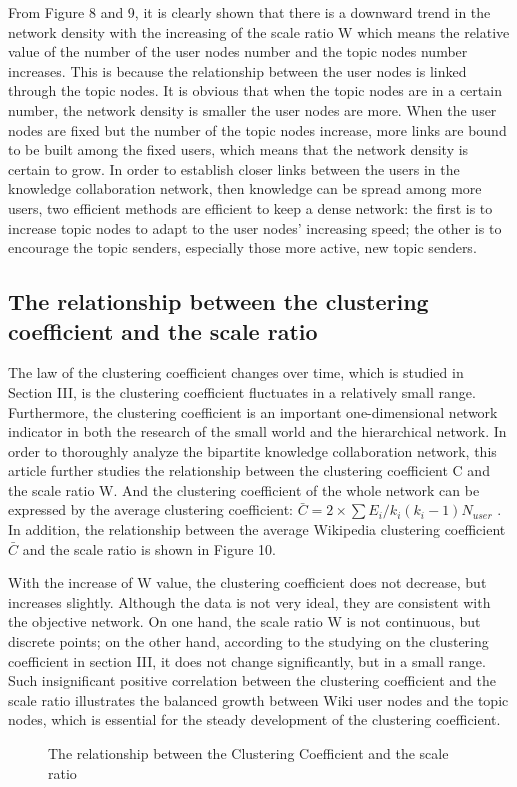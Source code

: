 \documentclass{elsarticle}
\begin{document}
From Figure 8 and 9, it is clearly shown that there is a downward trend in the network density with the increasing of the scale ratio W which means the relative value of the number of the user nodes number and the topic nodes number increases. This is because the relationship between the user nodes is linked through the topic nodes. It is obvious that when the topic nodes are in a certain number, the network density is smaller the user nodes are more. When the user nodes are fixed but the number of the topic nodes increase, more links are bound to be built among the fixed users, which means that the network density is certain to grow. In order to establish closer links between the users in the knowledge collaboration network, then knowledge can be spread among more users, two efficient methods are efficient to keep a dense network: the first is to increase topic nodes to adapt to the user nodes’ increasing speed; the other is to encourage the topic senders, especially those more active, new topic senders. 

\subsection{ The relationship between the clustering coefficient and the scale ratio}
\label{sec:relat-betw-clust}

The law of the clustering coefficient changes over time, which is
studied in Section III, is the clustering coefficient fluctuates in a
relatively small range. Furthermore, the clustering coefficient is an
important one-dimensional network indicator in both the research of
the small world and the hierarchical network. In order to thoroughly
analyze the bipartite knowledge collaboration network, this article
further studies the relationship between the clustering coefficient C
and the scale ratio W. And the clustering coefficient of the whole
network can be expressed by the average clustering coefficient:
$\bar{C}=2\times \sum E_i/k_i(k_i-1)N_{user}$ . In addition, the
relationship between the average Wikipedia clustering coefficient
$\bar{C}$ and the scale ratio is shown in Figure 10. 

With the increase of W value, the clustering coefficient does not decrease, but increases slightly. Although the data is not very ideal, they are consistent with the objective network. On one hand, the scale ratio W is not continuous, but discrete points; on the other hand, according to the studying on the clustering coefficient in section III, it does not change significantly, but in a small range. Such insignificant positive correlation between the clustering coefficient and the scale ratio illustrates the balanced growth between Wiki user nodes and the topic nodes, which is essential for the steady development of the clustering coefficient. 
\begin{figure}[htpb]
  \centering
  \scalebox{0.3}{\texttt{[image: 10]}}
  \caption{The relationship between the  Clustering Coefficient  and the scale ratio}
\end{figure}
\end{document}
